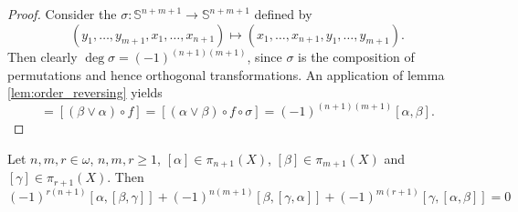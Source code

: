 \begin{proof}
	Consider the  $\sigma : \mathbb{S}^{n + m + 1} \to \mathbb{S}^{n + m + 1}$ defined by
	\begin{equation*}
		(y_1,\dots,y_{m + 1},x_1,\dots,x_{n + 1}) \mapsto (x_1, \dots,x_{n + 1},y_1,\dots,y_{m + 1}).
	\end{equation*}
	Then clearly $\deg \sigma = (-1)^{(n + 1)(m + 1)}$, since $\sigma$ is the composition of permutations and hence orthogonal transformations. An application of lemma \ref{lem:order_reversing} yields 
	\begin{equation*}
		[\beta,\alpha] = [(\beta \vee \alpha) \circ f] = [(\alpha \vee \beta) \circ f \circ \sigma] = (-1)^{(n + 1)(m + 1)}[\alpha,\beta].
	\end{equation*}
\end{proof}

\begin{proposition}
	Let $n,m,r \in \omega$, $n,m,r \geq 1$, $[\alpha] \in \pi_{n + 1}(X)$, $[\beta] \in \pi_{m + 1}(X)$ and $[\gamma] \in \pi_{r + 1}(X)$. Then
	\begin{equation*}
		(-1)^{r(n + 1)}[\alpha,[\beta,\gamma]] + (-1)^{n(m + 1)}[\beta,[\gamma,\alpha]] + (-1)^{m(r + 1)}[\gamma,[\alpha,\beta]] = 0
	\end{equation*}
\end{proposition}

\printbibliography


